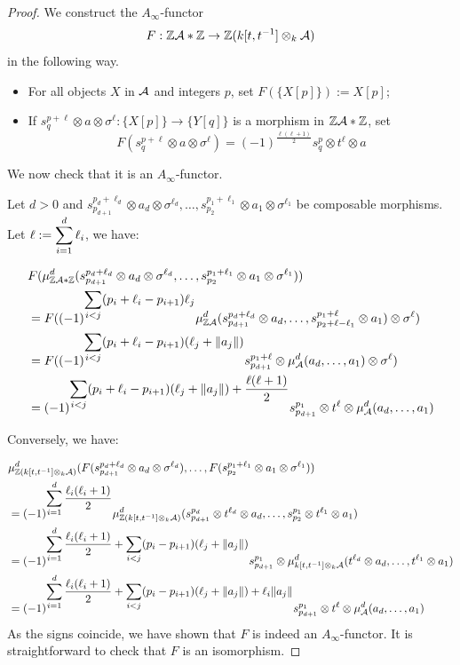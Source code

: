 \documentclass[12pt]{article}
\begin{document}
	\begin{proof}
		We construct the $A_\infty$-functor 
		\[F: \mathbb{Z} {\cal{A}} * \mathbb{Z} \to \mathbb{Z}(k[t,t^{-1}] \otimes_k {\cal{A}})\]
		\noindent in the following way.
		\begin{itemize}
			\item For all objects $X$ in ${\cal{A}}$ and integers $p$, set $F(\{X[p]\}):= X[p]$;
			\item If $s^{p+\ell}_q \otimes a \otimes \sigma^\ell: \{X[p]\} \to \{Y[q]\}$ is a morphism in $\mathbb{Z} {\cal{A}} * \mathbb{Z}$, set 
			\[F(s^{p+\ell}_q \otimes a \otimes \sigma^\ell) = (-1)^{\frac{\ell(\ell+1)}{2}} s^p_q \otimes t^\ell \otimes a \]
		\end{itemize}
		We now check that it is an $A_\infty$-functor. 
		
		\noindent Let $d>0$ and $s^{p_d+\ell_d}_{p_{d+1}} \otimes a_d \otimes \sigma^{\ell_d},\dots,s^{p_1+\ell_1}_{p_2} \otimes a_1 \otimes \sigma^{\ell_1}$ be composable morphisms. Let $\ell:= \displaystyle\sum_{i=1}^d \ell_i$, we have:
		
		\begin{align*}
			& F(\mu^d_{\mathbb{Z}{\cal{A}} * \mathbb{Z}}(s^{p_d+\ell_d}_{p_{d+1}} \otimes a_d \otimes \sigma^{\ell_d},\dots,s^{p_1+\ell_1}_{p_2} \otimes a_1 \otimes \sigma^{\ell_1})) \\
			&= F((-1)^{\displaystyle\sum_{i<j}(p_i + \ell_i - p_{i+1}) \ell_j} \mu^d_{\mathbb{Z} {\cal{A}}}(s^{p_d+\ell_d}_{p_{d+1}} \otimes a_d,\dots,s^{p_1+\ell}_{p_2 + \ell-\ell_1} \otimes a_1) \otimes \sigma^\ell) \\
			&= F((-1)^{\displaystyle\sum_{i<j}(p_i + \ell_i - p_{i+1})(\ell_j + \|a_j\|)} s^{p_1+\ell}_{p_{d+1}} \otimes \mu^d_{\cal{A}}(a_d,\dots,a_1) \otimes \sigma^\ell) \\
			&= (-1)^{\displaystyle\sum_{i<j}(p_i + \ell_i - p_{i+1})(\ell_j + \|a_j\|) + \frac{\ell(\ell+1)}{2}} s^{p_1}_{p_{d+1}} \otimes t^\ell \otimes \mu^d_{\cal{A}}(a_d,\dots,a_1)
		\end{align*}
		
		Conversely, we have:
		
		\begin{align*}
			& \mu^d_{\mathbb{Z}(k[t,t^{-1}] \otimes_k {\cal{A}})}(F(s^{p_d+\ell_d}_{p_{d+1}} \otimes a_d \otimes \sigma^{\ell_d}),\dots,F(s^{p_1+\ell_1}_{p_2} \otimes a_1 \otimes \sigma^{\ell_1})) \\
			&= (-1)^{\displaystyle\sum_{i=1}^{d} \frac{\ell_i(\ell_i+1)}{2}} \mu^d_{\mathbb{Z}(k[t,t^{-1}] \otimes_k {\cal{A}})}(s^{p_d}_{p_{d+1}} \otimes t^{\ell_d} \otimes a_d, \dots, s^{p_1}_{p_2} \otimes t^{\ell_1} \otimes a_1) \\
			&= (-1)^{\displaystyle\sum_{i=1}^{d} \frac{\ell_i(\ell_i+1)}{2} + \sum_{i<j} (p_i - p_{i+1})(\ell_j + \|a_j\|)} s^{p_1}_{p_{d+1}} \otimes \mu^d_{k[t,t^{-1}] \otimes_k {\cal{A}}}(t^{\ell_d} \otimes a_d, \dots, t^{\ell_1} \otimes a_1) \\
			&= (-1)^{\displaystyle\sum_{i=1}^{d} \frac{\ell_i(\ell_i+1)}{2} + \sum_{i<j} (p_i - p_{i+1})(\ell_j + \|a_j\|) + \ell_i \|a_j\|}s^{p_1}_{p_{d+1}} \otimes t^\ell \otimes \mu^d_{\cal{A}}(a_d,\dots,a_1)
		\end{align*}
		As the signs coincide, we have shown that $F$ is indeed an $A_\infty$-functor. It is straightforward to check that $F$ is an isomorphism.
		 

\end{proof}
\end{document}
